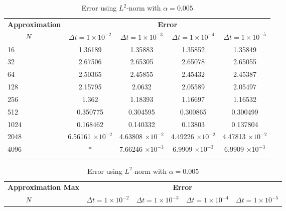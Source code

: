 	\begin{table}[H]
	\begin{tabular}{lcccc}
		\toprule
		\multicolumn{1}{c}{\textbf{Approximation}} & \multicolumn{4}{c}{\textbf{Error}} \\
		$\hspace{9mm}N$ & $\Delta t=1\times 10^{-2}$ & $\Delta t=1\times 10^{-3}$ & $\Delta t=1\times 10^{-4}$ & $\Delta t=1\times 10^{-5}$ \\
		\midrule
		\hspace{7mm} 16 & 1.36189   & 1.35883    & 1.35852   & 1.35849   \\
		\midrule
		\hspace{7mm} 32 & 2.67506   & 2.65305    & 2.65078   & 2.65055   \\
		\midrule
		\hspace{7mm} 64 & 2.50365   & 2.45855    & 2.45432   & 2.45387   \\
		\midrule
		\hspace{7mm} 128 & 2.15795   & 2.0632     & 2.05589   & 2.05497   \\
		\midrule
		\hspace{7mm} 256 & 1.362     & 1.18393    & 1.16697   & 1.16532   \\
		\midrule
		\hspace{7mm} 512 & 0.350775  & 0.304595   & 0.300865  & 0.300499  \\
		\midrule
		\hspace{7mm} 1024 & 0.168462  & 0.140332   & 0.13803   & 0.137804  \\
		\midrule
		\hspace{7mm} 2048 & 6.56161 $\times 10^{-2}$ & 4.63808 $\times 10^{-2}$  & 4.49226 $\times 10^{-2}$ & 4.47813 $\times 10^{-2}$ \\
		\midrule
		\hspace{7mm} 4096 & $\ast$         & 7.66246 $\times 10^{-3}$ & 6.9909 $\times 10^{-3}$ & 6.9909 $\times 10^{-3}$         \\
		\\
		\bottomrule
	\end{tabular}
	\caption{Error using $L^2$-norm with $\alpha=0.005$}
	\label{Collocation_tabla_L2_alpha=005}
	\vspace{1cm}
	\begin{tabular}{lcccc}
		\toprule
		\multicolumn{1}{c}{\textbf{Approximation Max}} & \multicolumn{4}{c}{\textbf{Error}} \\
		$\hspace{9mm}N$ & $\Delta t=1\times 10^{-2}$ & $\Delta t=1\times 10^{-3}$ & $\Delta t=1\times 10^{-4}$ & $\Delta t=1\times 10^{-5}$ \\

\end{tabular}
\end{table}
